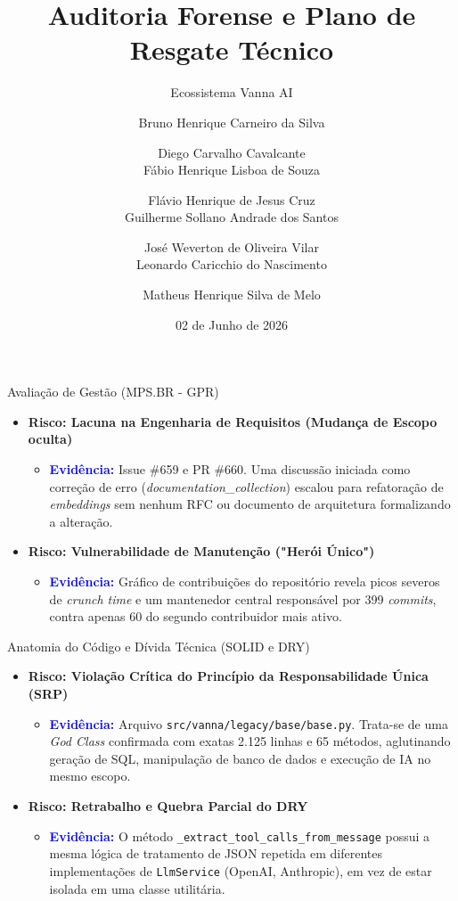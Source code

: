 \documentclass[10pt, aspectratio=169]{beamer}
\title[Auditoria Vanna AI]{Auditoria Forense e Plano de Resgate Técnico}
\subtitle{Ecossistema Vanna AI}
\author[Equipe de Auditoria]{
    Bruno Henrique Carneiro da Silva \and Diego Carvalho Cavalcante \\
    Fábio Henrique Lisboa de Souza \and Flávio Henrique de Jesus Cruz \\
    Guilherme Sollano Andrade dos Santos \and José Weverton de Oliveira Vilar \\
    Leonardo Caricchio do Nascimento \and Matheus Henrique Silva de Melo
}
\institute[COMP0503]{Engenharia de Software (COMP0503)}
\date{02 de Junho de 2026}
\begin{document}
\begin{frame}
    \titlepage
\end{frame}

\begin{frame}{Avaliação de Gestão (MPS.BR - GPR)}
    \begin{itemize}
        \item \textbf{Risco: Lacuna na Engenharia de Requisitos (Mudança de Escopo oculta)}
        \begin{itemize}
            \item \textcolor{blue}{\textbf{Evidência:}} Issue \#659 e PR \#660. Uma discussão iniciada como correção de erro (\textit{documentation\_collection}) escalou para refatoração de \textit{embeddings} sem nenhum RFC ou documento de arquitetura formalizando a alteração.
        \end{itemize}
        \vspace{0.3cm}
        
        \item \textbf{Risco: Vulnerabilidade de Manutenção ("Herói Único")}
        \begin{itemize}
            \item \textcolor{blue}{\textbf{Evidência:}} Gráfico de contribuições do repositório revela picos severos de \textit{crunch time} e um mantenedor central responsável por 399 \textit{commits}, contra apenas 60 do segundo contribuidor mais ativo.
        \end{itemize}
    \end{itemize}
\end{frame}

\begin{frame}{Anatomia do Código e Dívida Técnica (SOLID e DRY)}
    \begin{itemize}
        \item \textbf{Risco: Violação Crítica do Princípio da Responsabilidade Única (SRP)}
        \begin{itemize}
            \item \textcolor{blue}{\textbf{Evidência:}} Arquivo \texttt{src/vanna/legacy/base/base.py}. Trata-se de uma \textit{God Class} confirmada com exatas 2.125 linhas e 65 métodos, aglutinando geração de SQL, manipulação de banco de dados e execução de IA no mesmo escopo.
        \end{itemize}
        \vspace{0.3cm}

        \item \textbf{Risco: Retrabalho e Quebra Parcial do DRY}
        \begin{itemize}
            \item \textcolor{blue}{\textbf{Evidência:}} O método \texttt{\_extract\_tool\_calls\_from\_message} possui a mesma lógica de tratamento de JSON repetida em diferentes implementações de \texttt{LlmService} (OpenAI, Anthropic), em vez de estar isolada em uma classe utilitária.
        \end{itemize}
    \end{itemize}
\end{frame}
\end{document}
